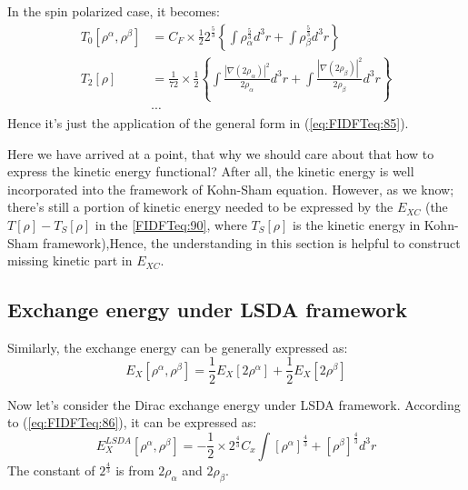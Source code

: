 In the spin polarized case, it becomes:
\begin{align}\label{}
T_{0}[\rho^{\alpha}, \rho^{\beta}] &=
C_{F}\times\frac{1}{2}2^{\frac{5}{3}} \left\{\int
\rho_{\alpha}^{\frac{5}{3}}d^{3}r +
       \int \rho_{\beta}^{\frac{5}{3}}d^{3}r   \right\} \nonumber \\
T_{2}[\rho] &= \frac{1}{72}\times\frac{1}{2}\left\{ \int
\frac{|\nabla (2\rho_{\alpha})|^{2}}{2\rho_{\alpha}} d^{3}r  + \int
\frac{|\nabla (2\rho_{\beta})|^{2}}{2\rho_{\beta}} d^{3}r
\right\}\nonumber \\
&\cdots
\end{align}
Hence it's just the application of the general form in
(\ref{eq:FIDFTeq:85}).

Here we have arrived at a point, that why we should care about that
how to express the kinetic energy functional? After all, the kinetic
energy is well incorporated into the framework of Kohn-Sham
equation. However, as we know; there's still a portion of kinetic
energy needed to be expressed by the $E_{XC}$ (the $T[\rho] -
T_{S}[\rho]$ in the \ref{FIDFTeq:90}, where $T_{S}[\rho]$ is the
kinetic energy in Kohn-Sham framework),Hence, the understanding in this
section is helpful to construct missing kinetic part in $E_{XC}$.


\subsection{Exchange energy under LSDA framework}
\label{sec:EC_LSDA_in_functional}
%
%
%
%
Similarly, the exchange energy can be generally expressed as:
\begin{equation}\label{eq:FIDFTeq:86}
E_{X}[\rho^{\alpha}, \rho^{\beta}] =
\frac{1}{2}E_{X}[2\rho^{\alpha}] + \frac{1}{2}E_{X}[2\rho^{\beta}]
\end{equation}

Now let's consider the Dirac exchange energy under LSDA framework.
According to (\ref{eq:FIDFTeq:86}), it can be expressed as:
\begin{equation}\label{eq:FIDFTeq:87}
E_{X}^{LSDA}[\rho^{\alpha}, \rho^{\beta}] = -\frac{1}{2}\times 2^{\frac{4}{3}}C_{x}\int
[\rho^{\alpha}]^{\frac{4}{3}} + 
[\rho^{\beta}]^{\frac{4}{3}} d^{3}r
\end{equation}
The constant of $2^{\frac{4}{3}}$ is from $2\rho_{\alpha}$ and $2\rho_{\beta}$.

